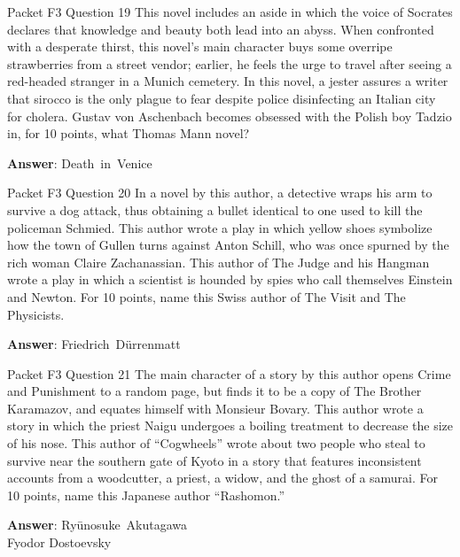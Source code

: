 \begin{frame}{Packet F3 Question 19}
This novel includes an aside in which the voice of Socrates declares that knowledge and beauty both lead into an abyss. When confronted with a desperate thirst, this novel's main character buys some overripe strawberries from a street vendor; earlier, he feels the   urge to travel after seeing a red-headed   stranger in a Munich cemetery. In this novel, a jester assures a writer that sirocco is the only plague to fear despite police disinfecting an Italian city for cholera. Gustav   von Aschenbach becomes   obsessed with the Polish boy Tadzio in, for 10 points, what Thomas Mann novel?

\textbf{Answer}: Death\ in\ Venice\\
\end{frame}

\begin{frame}{Packet F3 Question 20}
In a novel by this author, a detective wraps his arm to survive a dog attack, thus obtaining a bullet identical to one used to kill the policeman Schmied. This author wrote a play in which yellow shoes symbolize how the town of Gullen turns against Anton Schill, who was once spurned by the rich woman Claire Zachanassian.     This author of The Judge and his Hangman wrote a play in which a scientist is hounded by spies who   call themselves Einstein and Newton. For 10 points, name this Swiss author of The   Visit and The Physicists.

\textbf{Answer}: Friedrich\ Dürrenmatt\\
\end{frame}

\begin{frame}{Packet F3 Question 21}
The main character of a story by this author opens Crime and Punishment to a random page, but finds it to be a copy of The Brother Karamazov, and equates himself   with Monsieur Bovary. This author wrote a story in which the priest Naigu undergoes a boiling treatment to decrease the size of his nose. This   author of ``Cogwheels'' wrote about two     people who steal to survive near the southern gate of Kyoto in a story that features inconsistent accounts from a woodcutter, a priest, a widow, and the ghost of a samurai. For 10 points, name this Japanese   author ``Rashomon.''

\textbf{Answer}: Ryūnosuke\ Akutagawa\\
 Fyodor Dostoevsky
\end{frame}

